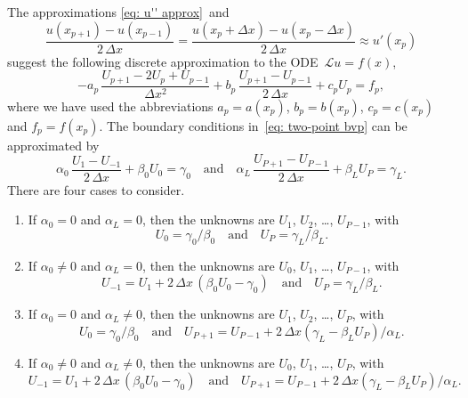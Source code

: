 The approximations \eqref{eq: u'' approx}~and
\[
\frac{u(x_{p+1})-u(x_{p-1})}{2\,\Delta x}
	=\frac{u(x_p+\Delta x)-u(x_p-\Delta x)}{2\,\Delta x}
	\approx u'(x_p)
\]
suggest the following discrete approximation to the ODE~$\mathcal{L}u=f(x)$,
\begin{equation}\label{eq: Lu=f finite diff}
-a_p\,\frac{U_{p+1}-2U_p+U_{p-1}}{\Delta x^2}
	+b_p\,\frac{U_{p+1}-U_{p-1}}{2\,\Delta x}+c_pU_p=f_p,
\end{equation}
where we have used the abbreviations $a_p=a(x_p)$, $b_p=b(x_p)$, $c_p=c(x_p)$
and $f_p=f(x_p)$.  The boundary conditions in~\eqref{eq: two-point bvp} can be 
approximated by
\[
\alpha_0\,\frac{U_1-U_{-1}}{2\,\Delta x}+\beta_0U_0=\gamma_0
\quad\text{and}\quad
\alpha_L\,\frac{U_{P+1}-U_{P-1}}{2\,\Delta x}+\beta_LU_P=\gamma_L.
\]
There are four cases to consider.
\begin{enumerate}
\item If $\alpha_0=0$ and $\alpha_L=0$, then the unknowns are
$U_1$, $U_2$, \dots, $U_{P-1}$, with
\[
U_0=\gamma_0/\beta_0\quad\text{and}\quad U_P=\gamma_L/\beta_L.
\]
\item If $\alpha_0\ne0$ and $\alpha_L=0$, then the unknowns are
$U_0$, $U_1$, \dots, $U_{P-1}$, with 
\[
U_{-1}=U_1+2\,\Delta x\,(\beta_0U_0-\gamma_0)\quad\text{and}\quad
U_P=\gamma_L/\beta_L.
\]
\item If $\alpha_0=0$ and $\alpha_L\ne0$, then the unknowns are
$U_1$, $U_2$, \dots, $U_P$, with 
\[
U_0=\gamma_0/\beta_0\quad\text{and}\quad
U_{P+1}=U_{P-1}+2\,\Delta x(\gamma_L-\beta_LU_P)/\alpha_L.
\]
\item If $\alpha_0\ne0$ and $\alpha_L\ne0$, then the unknowns are
$U_0$, $U_1$, \dots, $U_P$, with
\[ 
U_{-1}=U_1+2\,\Delta x\,(\beta_0U_0-\gamma_0)\quad\text{and}\quad
U_{P+1}=U_{P-1}+2\,\Delta x(\gamma_L-\beta_LU_P)/\alpha_L.
\]
\end{enumerate}

